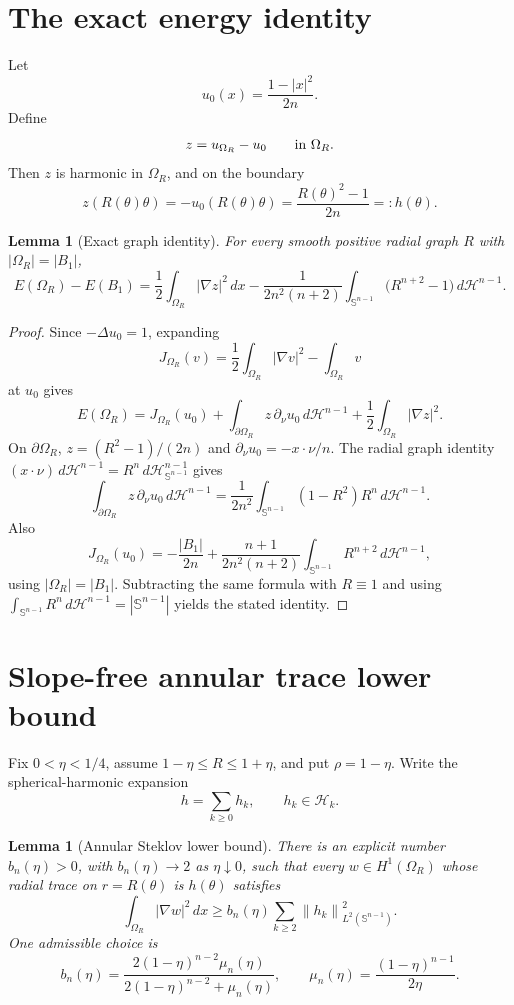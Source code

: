 \documentclass[11pt]{article}
\newtheorem{lemma}[theorem]{Lemma}
\newcommand{\Sph}{\mathbb S^{n-1}}
\newcommand{\Om}{\Omega}
\newcommand{\dH}{\,d\mathcal H^{n-1}}
\newcommand{\norm}[1]{\left\|#1\right\|}
\begin{document}
\section{The exact energy identity}

Let
\[
   u_0(x)=\frac{1-|x|^2}{2n}.
\]
Define
\[
   z=u_{\Om_R}-u_0 \qquad\hbox{in }\Om_R.
\]
Then \(z\) is harmonic in \(\Om_R\), and on the boundary
\[
   z(R(\theta)\theta)=-u_0(R(\theta)\theta)
      =\frac{R(\theta)^2-1}{2n}
      =:h(\theta).
\]

\begin{lemma}[Exact graph identity]\label{lem:identity}
For every smooth positive radial graph \(R\) with \(|\Om_R|=|B_1|\),
\[
   E(\Om_R)-E(B_1)
   =\frac12\int_{\Om_R}|\nabla z|^2\,dx
     -\frac{1}{2n^2(n+2)}
      \int_{\Sph}\bigl(R^{n+2}-1\bigr)\dH .
\]
\end{lemma}

\begin{proof}
Since \(-\Delta u_0=1\), expanding
\[
   J_{\Om_R}(v)=\frac12\int_{\Om_R}|\nabla v|^2-\int_{\Om_R}v
\]
at \(u_0\) gives
\[
   E(\Om_R)=J_{\Om_R}(u_0)
      +\int_{\partial\Om_R}z\,\partial_\nu u_0\,d\mathcal H^{n-1}
      +\frac12\int_{\Om_R}|\nabla z|^2 .
\]
On \(\partial\Om_R\), \(z=(R^2-1)/(2n)\) and
\(\partial_\nu u_0=-x\cdot\nu/n\).  The radial graph identity
\((x\cdot\nu)\,d\mathcal H^{n-1}=R^n\,d\mathcal H^{n-1}_{\Sph}\) gives
\[
   \int_{\partial\Om_R}z\,\partial_\nu u_0\,d\mathcal H^{n-1}
   =\frac{1}{2n^2}\int_{\Sph}(1-R^2)R^n\dH .
\]
Also
\[
   J_{\Om_R}(u_0)
   =-\frac{|B_1|}{2n}
     +\frac{n+1}{2n^2(n+2)}\int_{\Sph}R^{n+2}\dH ,
\]
using \(|\Om_R|=|B_1|\).  Subtracting the same formula with \(R\equiv1\)
and using \(\int_{\Sph}R^n\,d\mathcal H^{n-1}=|\Sph|\) yields the stated
identity.
\end{proof}

\section{Slope-free annular trace lower bound}

Fix \(0<\eta<1/4\), assume \(1-\eta\le R\le1+\eta\), and put
\(\rho=1-\eta\).  Write the spherical-harmonic expansion
\[
   h=\sum_{k\ge0}h_k,\qquad h_k\in\mathcal H_k.
\]

\begin{lemma}[Annular Steklov lower bound]\label{lem:annular}
There is an explicit number \(b_n(\eta)>0\), with \(b_n(\eta)\to2\) as
\(\eta\downarrow0\), such that every \(w\in H^1(\Om_R)\) whose radial
trace on \(r=R(\theta)\) is \(h(\theta)\) satisfies
\[
   \int_{\Om_R}|\nabla w|^2\,dx
      \ge b_n(\eta)\sum_{k\ge2}\norm{h_k}_{L^2(\Sph)}^2.
\]
One admissible choice is
\[
   b_n(\eta)
   =\frac{2(1-\eta)^{n-2}\mu_n(\eta)}
          {2(1-\eta)^{n-2}+\mu_n(\eta)},
   \qquad
   \mu_n(\eta)=\frac{(1-\eta)^{n-1}}{2\eta}.
\]
\end{lemma}
\end{document}
